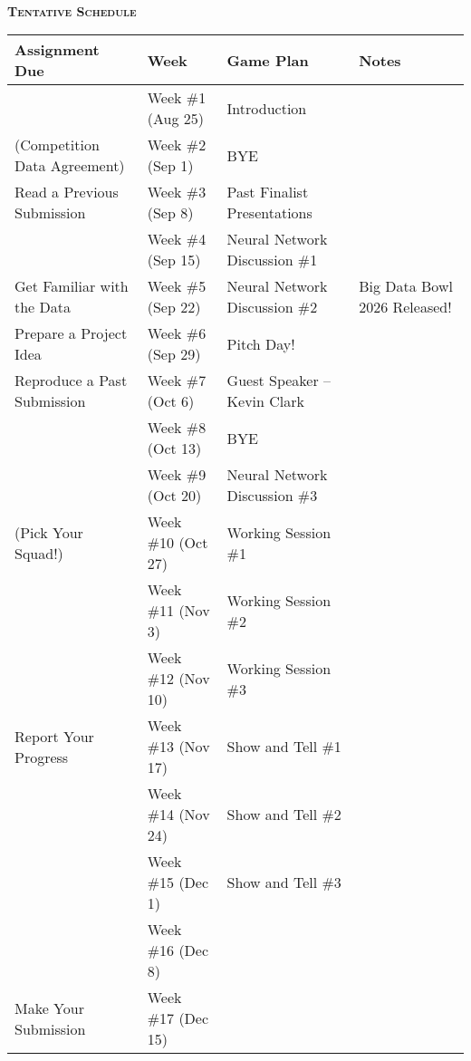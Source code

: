\documentclass[11pt]{article}
\begin{document}
~\\
\textbf{\textsc{Tentative Schedule}}
\begin{center}
  \begin{tabular}{llll}
    Assignment Due                & Week                & Game Plan                     & Notes\\
    \hline
    \hline
                                  & Week \#1 (Aug 25)   & Introduction\\
    (Competition Data Agreement)  & Week \#2 (Sep 1)    & BYE\\
    Read a Previous Submission    & Week \#3 (Sep 8)    & Past Finalist Presentations\\
    \hline
                                  & Week \#4 (Sep 15)   & Neural Network Discussion \#1\\
    Get Familiar with the Data    & Week \#5 (Sep 22)   & Neural Network Discussion \#2 & Big Data Bowl 2026 Released!\\
    \hline
    Prepare a Project Idea        & Week \#6 (Sep 29)   & Pitch Day!\\
    Reproduce a Past Submission   & Week \#7 (Oct 6)    & Guest Speaker -- Kevin Clark\\
    \hline
                                  & Week \#8 (Oct 13)   & BYE\\
                                  & Week \#9 (Oct 20)   & Neural Network Discussion \#3\\
    (Pick Your Squad!)            & Week \#10 (Oct 27)  & Working Session \#1\\
                                  & Week \#11 (Nov 3)   & Working Session \#2\\
                                  & Week \#12 (Nov 10)  & Working Session \#3\\
    Report Your Progress          & Week \#13 (Nov 17)  & Show and Tell \#1\\
                                  & Week \#14 (Nov 24)  & Show and Tell \#2\\
                                  & Week \#15 (Dec 1)   & Show and Tell \#3\\
    \hline
                                  & Week \#16 (Dec 8)   & \\
    Make Your Submission          & Week \#17 (Dec 15)  & \\
  \end{tabular}
\end{center}
\end{document}
